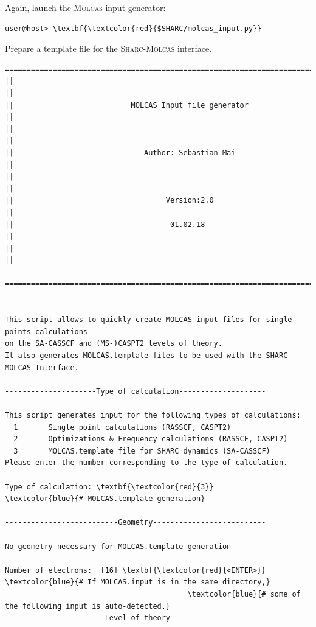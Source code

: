 \documentclass[a4paper,11pt,DIV=15,openany]{scrbook}
\newcommand{\sharc}{\textsc{Sharc}}
\begin{document}
Again, launch the \textsc{Molcas} input generator:
\begin{Verbatim}[commandchars=\\\{\}]
user@host> \textbf{\textcolor{red}{$SHARC/molcas_input.py}}
\end{Verbatim}
Prepare a template file for the \sharc-\textsc{Molcas} interface.
\begin{oframed}
\footnotesize\begin{Verbatim}[commandchars=\\\{\}]
  ================================================================================
||                                                                                ||
||                           MOLCAS Input file generator                          ||
||                                                                                ||
||                              Author: Sebastian Mai                             ||
||                                                                                ||
||                                   Version:2.0                                  ||
||                                    01.02.18                                    ||
||                                                                                ||
  ================================================================================


This script allows to quickly create MOLCAS input files for single-points calculations
on the SA-CASSCF and (MS-)CASPT2 levels of theory. 
It also generates MOLCAS.template files to be used with the SHARC-MOLCAS Interface.
  
---------------------Type of calculation--------------------

This script generates input for the following types of calculations:
  1       Single point calculations (RASSCF, CASPT2)
  2       Optimizations & Frequency calculations (RASSCF, CASPT2)
  3       MOLCAS.template file for SHARC dynamics (SA-CASSCF)
Please enter the number corresponding to the type of calculation.

Type of calculation: \textbf{\textcolor{red}{3}}        \textcolor{blue}{# MOLCAS.template generation}

--------------------------Geometry--------------------------

No geometry necessary for MOLCAS.template generation

Number of electrons:  [16] \textbf{\textcolor{red}{<ENTER>}}        \textcolor{blue}{# If MOLCAS.input is in the same directory,}
                                          \textcolor{blue}{# some of the following input is auto-detected.}
-----------------------Level of theory----------------------


\end{Verbatim}
\end{oframed}
\end{document}

